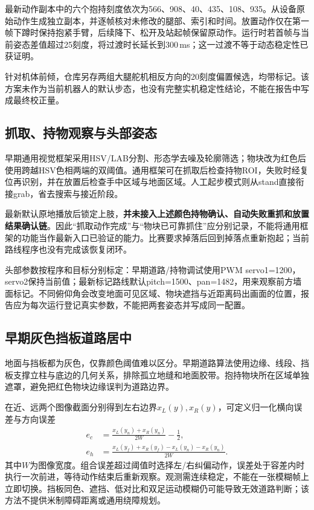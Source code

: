 最新动作副本中的六个抱持刻度依次为566、908、40、435、108、935。从设备原始动作生成独立副本，并逐帧核对未修改的腿部、索引和时间。放置动作仅在第一帧下蹲时保持抱紧手臂，后续降下、松开及站起帧保留原动作。运行时若首帧与当前姿态差值超过25刻度，将过渡时长延长到300\,ms；这一过渡不等于动态稳定性已获证明。

针对机体前倾，仓库另存两组大腿舵机相反方向的20刻度偏置候选，均带标记。该方案未作为当前机器人的默认步态，也没有完整实机稳定性结论，不能在报告中写成最终校正量。

\subsection{抓取、持物观察与头部姿态}
早期通用视觉框架采用HSV/LAB分割、形态学去噪及轮廓筛选；物块改为红色后使用跨越HSV色相两端的双阈值。通用框架可在抓取后检查持物ROI，失败时经复位再识别，并在放置后检查手中区域与地面区域。人工起步模式则从stand直接衔接grab，省去搜索与接近阶段。

最新默认原地播放后锁定上肢，\textbf{并未接入上述颜色持物确认、自动失败重抓和放置结果确认链}。因此“抓取动作完成”与“物块已可靠抓住”应分别记录，不能将通用框架的功能当作最新入口已验证的能力。比赛要求掉落后回到掉落点重新抱起；当前路线程序也没有完成该恢复闭环。

头部参数按程序和目标分别标定：早期道路/持物调试使用PWM servo1=1200，servo2保持当前值；最新标记路线默认pitch=1500、pan=1482，用来观察前方墙面标记。不同俯仰角会改变地面可见区域、物块遮挡与近距离码出画面的位置，报告应为每次运行登记真实参数，不能把两套姿态并写成同一配置。

\subsection{早期灰色挡板道路居中}
地面与挡板都为灰色，仅靠颜色阈值难以区分。早期道路算法使用边缘、线段、挡板支撑立柱与底边的几何关系，排除孤立地缝和地面胶带。抱持物块所在区域单独遮罩，避免把红色物块边缘误判为道路边界。

在近、远两个图像截面分别得到左右边界$x_L(y),x_R(y)$，可定义归一化横向误差与方向误差
\begin{align}
e_c&=\frac{x_L(y_n)+x_R(y_n)}{2W}-\frac12,\\
e_h&=\frac{x_L(y_f)+x_R(y_f)-x_L(y_n)-x_R(y_n)}{2W}.
\end{align}
其中$W$为图像宽度。组合误差超过阈值时选择左/右纠偏动作，误差处于容差内时执行一次前进，等待动作结束后重新观察。观测需连续稳定，不能在一张模糊帧上立即切换。挡板同色、遮挡、低对比和双足运动模糊仍可能导致无效道路判断；该方法不提供米制障碍距离或通用绕障规划。

